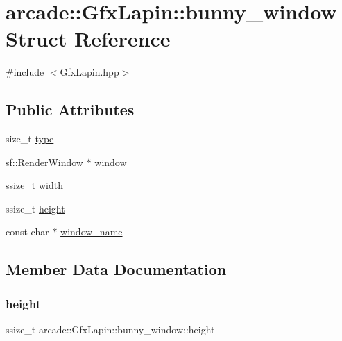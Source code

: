 \hypertarget{structarcade_1_1_gfx_lapin_1_1bunny__window}{}\section{arcade\+:\+:Gfx\+Lapin\+:\+:bunny\+\_\+window Struct Reference}
\label{structarcade_1_1_gfx_lapin_1_1bunny__window}


{\ttfamily \#include $<$Gfx\+Lapin.\+hpp$>$}

\subsection*{Public Attributes}
\begin{DoxyCompactItemize}
\item 
size\+\_\+t \hyperlink{structarcade_1_1_gfx_lapin_1_1bunny__window_a244ad1e472833f5778b301bb79b37b76}{type}
\item 
sf\+::\+Render\+Window $\ast$ \hyperlink{structarcade_1_1_gfx_lapin_1_1bunny__window_a9d397c64ed4b4d17df00cd4acddf5632}{window}
\item 
ssize\+\_\+t \hyperlink{structarcade_1_1_gfx_lapin_1_1bunny__window_afdc8b4dc731f6d51f596ea2d9a6ec9e9}{width}
\item 
ssize\+\_\+t \hyperlink{structarcade_1_1_gfx_lapin_1_1bunny__window_a8f57e2fcac1d4176524fdcbba4d968b2}{height}
\item 
const char $\ast$ \hyperlink{structarcade_1_1_gfx_lapin_1_1bunny__window_a9855e6af6789811f8ee718b615e22ee3}{window\+\_\+name}
\end{DoxyCompactItemize}


\subsection{Member Data Documentation}
\mbox{\label{structarcade_1_1_gfx_lapin_1_1bunny__window_a8f57e2fcac1d4176524fdcbba4d968b2}} 
\subsubsection{\texorpdfstring{height}{height}}
{\footnotesize\ttfamily ssize\+\_\+t arcade\+::\+Gfx\+Lapin\+::bunny\+\_\+window\+::height}

